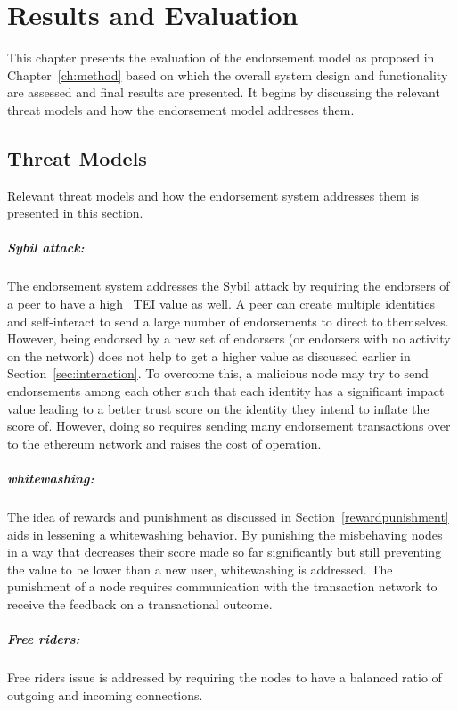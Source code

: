 \chapter{Results and Evaluation} \label{ch:results}
This chapter presents the evaluation of the endorsement model as proposed in
Chapter~\ref{ch:method} based on which the overall system design and
functionality are assessed and final results are presented. It begins by
discussing the relevant threat models and how the endorsement model addresses
them. 

\section{Threat Models}\label{sec:threatModel}
Relevant threat models and how the endorsement system addresses them is
presented in this section. 
\paragraph{Sybil attack:}The endorsement system addresses the Sybil attack by
requiring the endorsers of a peer to have a high ~\ac{TEI} value as well. A
peer can create multiple identities and self-interact to send a large number of
endorsements to direct to themselves. However, being endorsed by a new set of
endorsers (or endorsers with no activity on the network) does not help to get a
higher value as discussed earlier in Section~\ref{sec:interaction}. To overcome
this, a malicious node may try to send endorsements among each other such that
each identity has a significant impact value leading to a better trust score on
the identity they intend to inflate the score of. However, doing so requires
sending many endorsement transactions over to the ethereum network and raises
the cost of operation.   
\paragraph{whitewashing:} The idea of rewards and punishment as discussed in
Section~\ref{rewardpunishment} aids in lessening a whitewashing behavior. By
punishing the misbehaving nodes in a way that decreases their score made so far
significantly but still preventing the value to be lower than a new user,
whitewashing is addressed. The punishment of a node requires communication with
the transaction network to receive the feedback on a transactional outcome.  
\paragraph{Free riders:} Free riders issue is addressed by requiring the nodes
to have a balanced ratio of outgoing and incoming connections.
